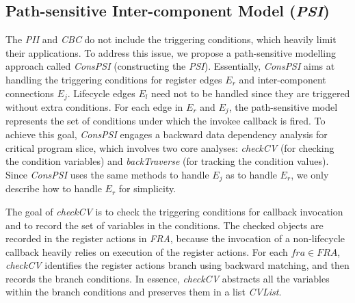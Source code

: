 
\subsection{Path-sensitive Inter-component Model (\textit{PSI})} 
The \textit{PII} and \textit{CBC} do not include the triggering conditions, which heavily limit their applications. To address this issue, we propose a path-sensitive modelling approach called \textit{ConsPSI} (constructing the \textit{PSI}). Essentially, \textit{ConsPSI} aims at handling the triggering conditions for register edges $E_{r}$ and inter-component connections $E_{j}$. Lifecycle edges $E_{l}$ need not to be handled since they are triggered without extra conditions. For each edge in $E_{r}$ and $E_{j}$, the path-sensitive model represents the set of conditions under which the invokee callback is fired. To achieve this goal, \textit{ConsPSI} engages a backward data dependency analysis for critical program slice, which involves two core analyses: \textit{checkCV} (for checking the condition variables) and \textit{backTraverse} (for tracking the condition values). Since \textit{ConsPSI} uses the same methods to handle $E_{j}$ as to handle $E_{r}$, we only describe how to handle $E_{r}$ for simplicity.

The goal of \textit{checkCV} is to check the triggering conditions for callback invocation and to record the set of variables in the conditions. The checked objects are recorded in the register actions in \textit{FRA}, because the invocation of a non-lifecycle callback heavily relies on execution of the register actions. For each $\mathit{fra}\in \mathit{FRA}$, \textit{checkCV} identifies the register actions branch using backward matching, and then records the branch conditions. In essence, \textit{checkCV} abstracts all the variables within the branch conditions and preserves them in a list \textit{CVList}.


